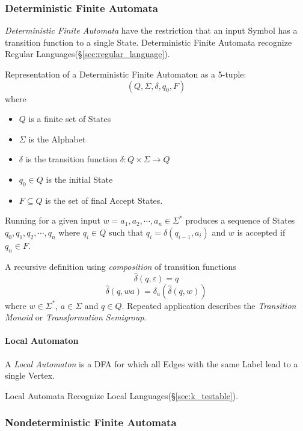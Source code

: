 \subsubsection{Deterministic Finite Automata}\label{sec:dfa}

\emph{Deterministic Finite Automata} have the restriction that an
input Symbol has a transition function to a single State.
Deterministic Finite Automata recognize Regular
Languages(\S\ref{sec:regular_language}).

Representation of a Deterministic Finite Automaton as a 5-tuple:
\[
    (Q,\Sigma,\delta,q_0,F)
\]
where
\begin{itemize}
\item $Q$ is a finite set of States
\item $\Sigma$ is the Alphabet
\item $\delta$ is the transition function $\delta: Q \times
  \Sigma \rightarrow Q$
\item $q_0 \in Q$ is the initial State
\item $F \subseteq Q$ is the set of final Accept States.
\end{itemize}

Running for a given input $w = a_1,a_2, \cdots , a_n \in \Sigma^*$
produces a sequence of States $q_0,q_1,q_2,\cdots , q_n$ where $q_i
\in Q$ such that $q_i = \delta (q_{i-1},a_i)$ and $w$ is accepted if
$q_n \in F$.

A recursive definition using \emph{composition} of transition
functions
\[
    \widehat{\delta}(q,\varepsilon) = q
\]\[
    \widehat{\delta}(q,wa) = \delta_a(\widehat{\delta}(q,w))
\]
where $w \in \Sigma^*$, $a \in \Sigma$ and $q \in Q$. Repeated
application describes the \emph{Transition Monoid} or
\emph{Transformation Semigroup}.

\paragraph{Local Automaton}\label{sec:local_automaton}
A \emph{Local Automaton} is a DFA for which all Edges with the same
Label lead to a single Vertex.

Local Automata Recognize Local Languages(\S\ref{sec:k_testable}).



\subsubsection{Nondeterministic Finite Automata}\label{sec:ndfa}

